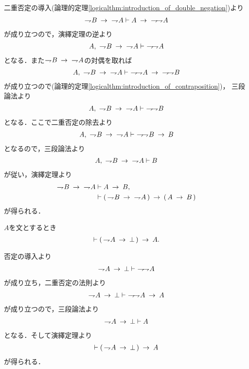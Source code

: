 	\begin{prf}
		二重否定の導入(論理的定理\ref{logicalthm:introduction_of_double_negation})より
		\begin{align}
			\negation B \rarrow\ \negation A \vdash 
			A \rarrow\ \negation \negation A
		\end{align}
		が成り立つので，演繹定理の逆より
		\begin{align}
			A,\ \negation B \rarrow\ \negation A \vdash\ \negation \negation A
		\end{align}
		となる．また$\negation B \rarrow\ \negation A$の対偶を取れば
		\begin{align}
			A,\ \negation B \rarrow\ \negation A \vdash\ 
			\negation \negation A \rarrow\ \negation \negation B
		\end{align}
		が成り立つので(論理的定理\ref{logicalthm:introduction_of_contraposition})，
		三段論法より
		\begin{align}
			A,\ \negation B \rarrow\ \negation A \vdash\ \negation \negation B
		\end{align}
		となる．ここで二重否定の除去より
		\begin{align}
			A,\ \negation B \rarrow\ \negation A \vdash\ 
			\negation \negation B \rarrow B
		\end{align}
		となるので，三段論法より
		\begin{align}
			A,\ \negation B \rarrow\ \negation A \vdash B
		\end{align}
		が従い，演繹定理より
		\begin{align}
			\negation B \rarrow\ \negation A &\vdash A \rarrow B, \\
			&\vdash (\, \negation B \rarrow\ \negation A\, ) 
			\rarrow (\, A \rarrow B\, )
		\end{align}
		が得られる．
		\QED
	\end{prf}
	
	\begin{screen}
		\begin{logicalthm}[背理法の原理]
		\label{logicalthm:proof_by_contradiction}
			$A$を文とするとき
			\begin{align}
				\vdash (\, \negation A \rarrow \bot\, ) \rarrow A.
			\end{align}
		\end{logicalthm}
	\end{screen}
	
	\begin{prf}
		否定の導入より
		\begin{align}
			\negation A \rarrow \bot \vdash\ \negation \negation A
		\end{align}
		が成り立ち，二重否定の法則より
		\begin{align}
			\negation A \rarrow \bot \vdash\ \negation \negation A \rarrow A
		\end{align}
		が成り立つので，三段論法より
		\begin{align}
			\negation A \rarrow \bot \vdash A
		\end{align}
		となる．そして演繹定理より
		\begin{align}
			\vdash (\, \negation A \rarrow \bot\, ) \rarrow A
		\end{align}
		が得られる．
		\QED
	\end{prf}
	
